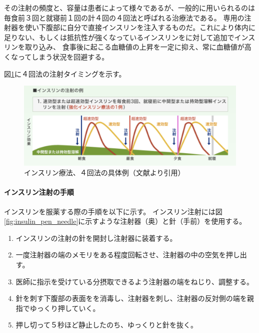 その注射の頻度と、容量は患者によって様々であるが、一般的に用いられるのは毎食前３回と就寝前１回の計４回の４回法と呼ばれる治療法である。\cite{insulin_treatment_method}\cite{diabetes_treatment_type1}
専用の注射器を使い下腹部に自分で直接インスリンを注入するものだ。これにより体内に足りない、もしくは抵抗性が強くなっているインスリンをに対して追加でインスリンを取り込み、
食事後に起こる血糖値の上昇を一定に抑え、常に血糖値が高くなってしまう状況を回避する。

\newpage

図\ref{fig:insulin_4times_method}に４回法の注射タイミングを示す。

\begin{figure}[htbp]
  \caption{インスリン療法、４回法の具体例（文献\cite{insulin_4times_method}より引用）}
  \label{fig:insulin_4times_method}
  \begin{center}
    \includegraphics[bb=0 0 700 300,width=15cm]{assets/insulin_4times_method.png}
  \end{center}
\end{figure}

\paragraph{インスリン注射の手順}
\label{paragraph:insulin_injection_steps}

インスリンを服薬する際の手順を以下に示す。
インスリン注射には図\ref{fig:insulin_pen_needle}に示すような注射器（奥）と針（手前）を使用する。

\begin{enumerate}
  \item インスリンの注射の針を開封し注射器に装着する。
  \item 一度注射器の端のメモリをある程度回転させ、注射器の中の空気を押し出す。
  \item 医師に指示を受けている分摂取できるよう注射器の端をねじり、調整する。
  \item 針を刺す下腹部の表面をを消毒し、注射器を刺し、注射器の反対側の端を親指でゆっくり押していく。
  \item 押し切って５秒ほど静止したのち、ゆっくりと針を抜く。
\end{enumerate}

